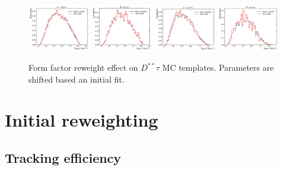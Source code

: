 \begin{figure}[ht]
    \includegraphics[width=0.24\textwidth]{
        ./figs-mc-correction/reweighting-form-factors/DststTau/D1stst0Tau.pdf
    }
    \includegraphics[width=0.24\textwidth]{
        ./figs-mc-correction/reweighting-form-factors/DststTau/D1ststTau.pdf
    }
    \includegraphics[width=0.24\textwidth]{
        ./figs-mc-correction/reweighting-form-factors/DststTau/D2stst0Tau.pdf
    }
    \includegraphics[width=0.24\textwidth]{
        ./figs-mc-correction/reweighting-form-factors/DststTau/D2ststTau.pdf
    }

    \caption{
        Form factor reweight effect on $D^{**}\tau$ MC templates.
        Parameters are shifted based an initial fit.
    }
    \label{fig:ff-rwt-Dstst-sig-like}
\end{figure}


\section{Initial reweighting}
\label{ref:mc-cor:init}

\subsection{Tracking efficiency}

